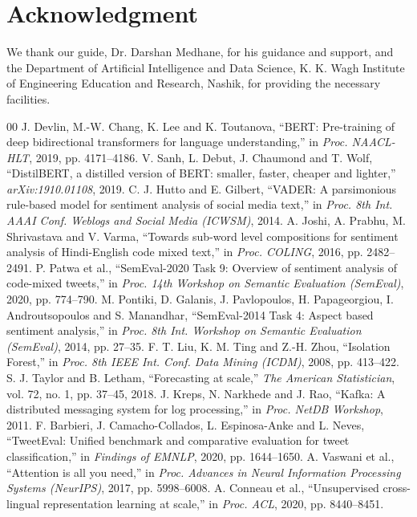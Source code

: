 \documentclass[conference]{IEEEtran}
\begin{document}
\section*{Acknowledgment}
We thank our guide, Dr. Darshan Medhane, for his guidance and support, and the Department of
Artificial Intelligence and Data Science, K. K. Wagh Institute of Engineering Education and Research,
Nashik, for providing the necessary facilities.

\begin{thebibliography}{00}
 J. Devlin, M.-W. Chang, K. Lee and K. Toutanova, ``BERT: Pre-training of deep
bidirectional transformers for language understanding,'' in \textit{Proc. NAACL-HLT}, 2019,
pp. 4171--4186.
 V. Sanh, L. Debut, J. Chaumond and T. Wolf, ``DistilBERT, a distilled version of BERT:
smaller, faster, cheaper and lighter,'' \textit{arXiv:1910.01108}, 2019.
 C. J. Hutto and E. Gilbert, ``VADER: A parsimonious rule-based model for sentiment
analysis of social media text,'' in \textit{Proc. 8th Int. AAAI Conf. Weblogs and Social Media
(ICWSM)}, 2014.
 A. Joshi, A. Prabhu, M. Shrivastava and V. Varma, ``Towards sub-word level compositions
for sentiment analysis of Hindi-English code mixed text,'' in \textit{Proc. COLING}, 2016,
pp. 2482--2491.
 P. Patwa et al., ``SemEval-2020 Task 9: Overview of sentiment analysis of code-mixed
tweets,'' in \textit{Proc. 14th Workshop on Semantic Evaluation (SemEval)}, 2020, pp. 774--790.
 M. Pontiki, D. Galanis, J. Pavlopoulos, H. Papageorgiou, I. Androutsopoulos and
S. Manandhar, ``SemEval-2014 Task 4: Aspect based sentiment analysis,'' in \textit{Proc. 8th Int.
Workshop on Semantic Evaluation (SemEval)}, 2014, pp. 27--35.
 F. T. Liu, K. M. Ting and Z.-H. Zhou, ``Isolation Forest,'' in \textit{Proc. 8th IEEE
Int. Conf. Data Mining (ICDM)}, 2008, pp. 413--422.
 S. J. Taylor and B. Letham, ``Forecasting at scale,'' \textit{The American
Statistician}, vol. 72, no. 1, pp. 37--45, 2018.
 J. Kreps, N. Narkhede and J. Rao, ``Kafka: A distributed messaging system for log
processing,'' in \textit{Proc. NetDB Workshop}, 2011.
 F. Barbieri, J. Camacho-Collados, L. Espinosa-Anke and L. Neves, ``TweetEval: Unified
benchmark and comparative evaluation for tweet classification,'' in \textit{Findings of EMNLP},
2020, pp. 1644--1650.
 A. Vaswani et al., ``Attention is all you need,'' in \textit{Proc. Advances in Neural
Information Processing Systems (NeurIPS)}, 2017, pp. 5998--6008.
 A. Conneau et al., ``Unsupervised cross-lingual representation learning at scale,'' in
\textit{Proc. ACL}, 2020, pp. 8440--8451.
\end{thebibliography}
\end{document}
